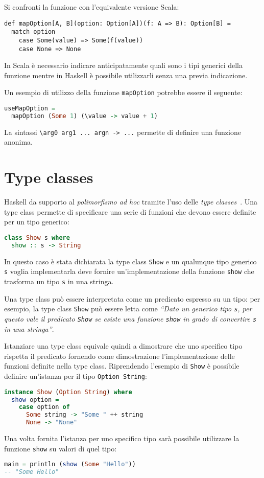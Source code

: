 Si confronti la funzione con l'equivalente versione Scala:
\begin{lstlisting}[language=scala3]
def mapOption[A, B](option: Option[A])(f: A => B): Option[B] =
  match option
    case Some(value) => Some(f(value))
    case None => None
\end{lstlisting}
In Scala è necessario indicare anticipatamente quali sono i tipi generici della funzione mentre in Haskell è possibile utilizzarli senza una previa indicazione.

Un esempio di utilizzo della funzione \lstinline{mapOption} potrebbe essere il seguente:
\begin{lstlisting}[language=haskell]
useMapOption =
  mapOption (Some 1) (\value -> value + 1)
\end{lstlisting}
La sintassi \lstinline{\arg0 arg1 ... argn -> ...} permette di definire una funzione anonima.

\section{Type classes}
Haskell da supporto al \emph{polimorfismo ad hoc} tramite l'uso delle \emph{type classes}~\cite{cit:type-classes-in-haskell}.
Una type class permette di specificare una serie di funzioni che devono essere definite per un tipo generico:
\begin{lstlisting}[language=haskell]
class Show s where
  show :: s -> String
\end{lstlisting}
In questo caso è stata dichiarata la type class \lstinline{Show} e un qualunque tipo generico \lstinline{s} voglia implementarla deve fornire un'implementazione della funzione \lstinline{show} che trasforma un tipo \lstinline{s} in una stringa.

Una type class può essere interpretata come un predicato espresso su un tipo: per esempio, la type class \lstinline{Show} può essere letta come \emph{``Dato un generico tipo \lstinline{s}, per questo vale il predicato \lstinline{Show} se esiste una funzione \lstinline{show} in grado di convertire \lstinline{s} in una stringa''}.

Istanziare una type class equivale quindi a dimostrare che uno specifico tipo rispetta il predicato fornendo come dimostrazione l'implementazione delle funzioni definite nella type class.
Riprendendo l'esempio di \lstinline{Show} è possibile definire un'istanza per il tipo \lstinline{Option String}:
\begin{lstlisting}[language=haskell]
instance Show (Option String) where
  show option =
    case option of
      Some string -> "Some " ++ string
      None -> "None"
\end{lstlisting}
Una volta fornita l'istanza per uno specifico tipo sarà possibile utilizzare la funzione \lstinline{show} su valori di quel tipo:
\begin{lstlisting}[language=haskell]
main = println (show (Some "Hello"))
-- "Some Hello"
\end{lstlisting}

